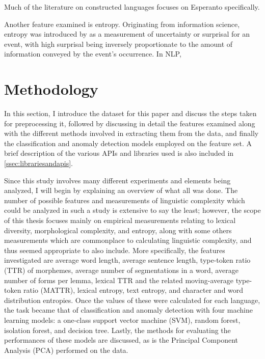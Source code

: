 \documentclass[12pt,a4paper]{article}
\numberwithin{figure}{section}
\numberwithin{table}{section}
\numberwithin{definition}{section}
\begin{document}
Much of the literature on constructed languages focuses on Esperanto specifically.

Another feature examined is entropy. Originating from information science, entropy was introduced by \textcite{Shannon1948book} as a measurement of uncertainty or surprisal for an event, with high surprisal being inversely proportionate to the amount of information conveyed by the event's occurrence. In NLP, 


\newpage
\section{Methodology}
\label{sec:methodology}

In this section, I introduce the dataset for this paper and discuss the steps taken for preprocessing it, followed by discussing in detail the features examined along with the different methods involved in extracting them from the data, and finally the classification and anomaly detection models employed on the feature set. A brief description of the various APIs and libraries used is also included in \ref{ssec:librariesandapis}. 

Since this study involves many different experiments and elements being analyzed, I will begin by explaining an overview of what all was done. The number of possible features and measurements of linguistic complexity which could be analyzed in such a study is extensive to say the least; however, the scope of this thesis focuses mainly on empirical measurements relating to lexical diversity, morphological complexity, and entropy, along with some others measurements which are commonplace to calculating linguistic complexity, and thus seemed appropriate to also include. More specifically, the features investigated are average word length, average sentence length, type-token ratio (TTR) of morphemes, average number of segmentations in a word, average number of forms per lemma, lexical TTR and the related moving-average type-token ratio (MATTR), lexical entropy, text entropy, and character and word distribution entropies. Once the values of these were calculated for each language, the task became that of classification and anomaly detection with four machine learning models: a one-class support vector machine (SVM), random forest, isolation forest, and decision tree. Lastly, the methods for evaluating the performances of these models are discussed, as is the Principal Component Analysis (PCA) performed on the data.
\end{document}
